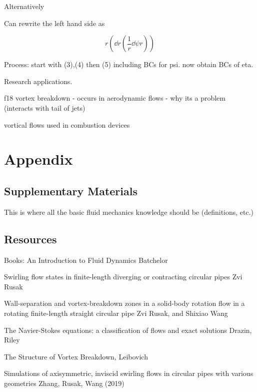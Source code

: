 \documentclass{X:/Documents/Coding/Latex/myreport}
\begin{document}
Alternatively


Can rewrite the left hand side as

\[r\left(\dd{}r \left(\frac1r \dd\psi r\right)\right)\]





Process: start with (3),(4) then (5) including BCs for psi. now obtain BCs of eta.

Research applications.

f18 vortex breakdown - occurs in aerodynamic flows - why its a problem (interacts with tail of jets)

vortical flows used in combustion devices


\clearpage
\section{Appendix}
\subsection{Supplementary Materials}
This is where all the basic fluid mechanics knowledge should be (definitions, etc.)

\subsection{Resources}
Books:
An Introduction to Fluid Dynamics
Batchelor

Swirling flow states in finite-length diverging or contracting circular pipes
Zvi Rusak


Wall-separation and vortex-breakdown zones in a solid-body rotation flow in a rotating finite-length straight circular pipe
Zvi Rusak, and Shixiao Wang

The Navier-Stokes equations: a classification of flows and exact solutions
Drazin, Riley


The Structure of Vortex Breakdown, 
Leibovich



Simulations of axisymmetric, inviscid swirling flows in circular pipes with various geometries
Zhang, Rusak, Wang (2019)
\end{document}
